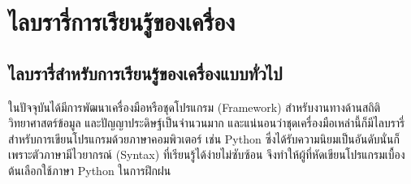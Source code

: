 

\chapter{ไลบรารี่การเรียนรู้ของเครื่อง}
\label{ch:library_ml}

\section{ไลบรารี่สำหรับการเรียนรู้ของเครื่องแบบทั่วไป}
\label{sec:lib_ml}

ในปัจจุบันได้มีการพัฒนาเครื่องมือหรือชุดโปรแกรม (Framework) สำหรับงานทางด้านสถิติ วิทยาศาสตร์ข้อมูล และปัญญาประดิษฐ์เป็นจำนวนมาก และแน่นอนว่าชุดเครื่องมือเหล่านี้ก็มีไลบรารี่สำหรับการเขียนโปรแกรมด้วยภาษาคอมพิวเตอร์ เช่น Python ซึ่งได้รับความนิยมเป็นอันดับนั่นก็เพราะตัวภาษามีไวยากรณ์ (Syntax) ที่เรียนรู้ได้ง่ายไม่ซับซ้อน จึงทำให้ผู้ที่หัดเขียนโปรแกรมเบื้องต้นเลือกใช้ภาษา Python ในการฝึกฝน

